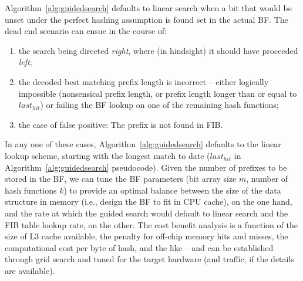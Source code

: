 \documentclass[conference,compsoc]{IEEEtran}
\begin{document}
Algorithm~\ref{alg:guidedsearch} defaults to linear search when a bit that
would be unset
under the perfect hashing assumption is found set in the actual BF.
The dead end scenario can ensue in the course of:

\begin{enumerate}
  \item the search being directed \emph{right}, where 
    (in hindsight) it should have proceeded \emph{left};
  \item the decoded best matching prefix length is incorrect -- either 
    logically impossible (nonsensical prefix length, or prefix length longer than
    or equal to $last_{hit}$) or failing the BF lookup on one of the 
    remaining hash functions;
  \item the case of false positive: The prefix is not found in
    FIB.
\end{enumerate}

In any one of these cases, Algorithm~\ref{alg:guidedsearch} defaults to the linear lookup
scheme, starting
with the longest match to date ($last_{hit}$ in Algorithm~\ref{alg:guidedsearch} pseudocode).
Given the number of prefixes to be stored in the BF, we can tune the BF 
parameters (bit array size $m$, number of hash functions $k$) to provide
an optimal balance between the size of the data structure in memory (i.e.,
design the BF to fit in CPU cache), on the one hand, and the rate at which
the guided search would default to linear search and the FIB table lookup 
rate, on the other. The cost benefit analysis is a
function of the size of L3 cache available, the penalty for off-chip memory 
hits and misses, the computational cost per byte of hash, and the like --
and can be established through grid search and tuned for the target 
hardware (and traffic, if the details are available).
\end{document}
